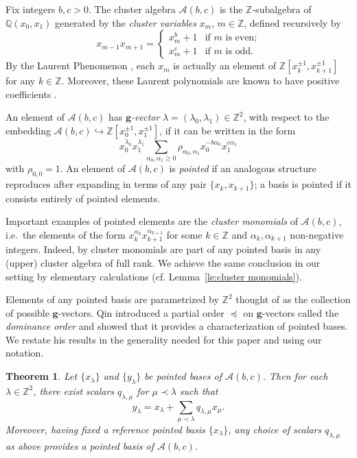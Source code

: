 \documentclass[pdflatex,sn-mathphys]{sn-jnl}%
\theoremstyle{thmstyleone}%
\newtheorem{theorem}{Theorem}[section]%
\theoremstyle{thmstyletwo}%
\theoremstyle{thmstylethree}%
\newcommand{\bfg}{\boldsymbol{g}}
\newcommand{\cA}{\mathcal{A}}
\newcommand{\QQ}{\mathbb{Q}}
\newcommand{\ZZ}{\mathbb{Z}}
\newcommand{\into}{\hookrightarrow}
\begin{document}
  Fix integers $b,c>0$.
  The cluster algebra $\cA(b,c)$ is the $\ZZ$-subalgebra of $\QQ(x_0,x_1)$ generated by the \emph{cluster variables} $x_m$, $m\in\ZZ$, defined recursively by
  \[
    x_{m-1}x_{m+1}=\begin{cases} x_m^b+1 & \text{if $m$ is even;}\\ x_m^c+1 & \text{if $m$ is odd.} \end{cases}
  \]
  By the Laurent Phenomenon \cite{FZ02}, each $x_m$ is actually an element of $\ZZ[x_k^{\pm1},x_{k+1}^{\pm1}]$ for any $k\in\ZZ$.
  Moreover, these Laurent polynomials are known to have positive coefficients \cite{GHKK18,LLZ14,LS15}.

  An element of $\cA(b,c)$ has \emph{$\bfg$-vector} $\lambda=(\lambda_0,\lambda_1)\in\ZZ^2$, with respect to the embedding ${\cA(b,c)\into\ZZ[x_0^{\pm1},x_{1}^{\pm1}]}$, if it can be written in the form
  \begin{equation}
    \label{eq:pointed}
    x_0^{\lambda_0}x_1^{\lambda_1}\sum\limits_{\alpha_0,\alpha_1 \ge 0} \rho_{\alpha_0,\alpha_1} x_0^{-b\alpha_0} x_1^{c\alpha_1}
  \end{equation}
  with $\rho_{0,0}=1$.
  An element of $\cA(b,c)$ is \emph{pointed} if an analogous structure reproduces after expanding in terms of any pair $\{x_k,x_{k+1}\}$; a basis is pointed if it consists entirely of pointed elements.

  Important examples of pointed elements are the \emph{cluster monomials} of $\cA(b,c)$, i.e.~the elements of the form $x_k^{\alpha_k}x_{k+1}^{\alpha_{k+1}}$ for some $k\in\ZZ$ and $\alpha_k,\alpha_{k+1}$ non-negative integers.
  Indeed, by \cite[Lemma 3.4.12]{Qin19} cluster monomials are part of any pointed basis in any (upper) cluster algebra of full rank.
  We achieve the same conclusion in our setting by elementary calculations (cf. Lemma~\ref{le:cluster monomials}).

  Elements of any pointed basis are parametrized by $\ZZ^2$ thought of as the collection of possible $\bfg$-vectors.
  Qin introduced a partial order $\preceq$ on $\bfg$-vectors called the \emph{dominance order} and showed that it provides a characterization of pointed bases.
  We restate his results in the generality needed for this paper and using our notation.
  \begin{theorem}
    \label{th:dominance}
    \cite[Theorem 1.2.1]{Qin19}
    Let $\{x_\lambda\}$ and $\{y_\lambda\}$ be pointed bases of $\cA(b,c)$.
    Then for each $\lambda\in\ZZ^2$, there exist scalars $q_{\lambda,\mu}$ for $\mu\prec\lambda$ such that
    \[y_\lambda=x_\lambda+\sum_{\mu\prec\lambda} q_{\lambda,\mu} x_\mu.\]
    Moreover, having fixed a reference pointed basis $\{x_\lambda\}$, any choice of scalars $q_{\lambda,\mu}$ as above provides a pointed basis of $\cA(b,c)$.
  \end{theorem}
\end{document}
